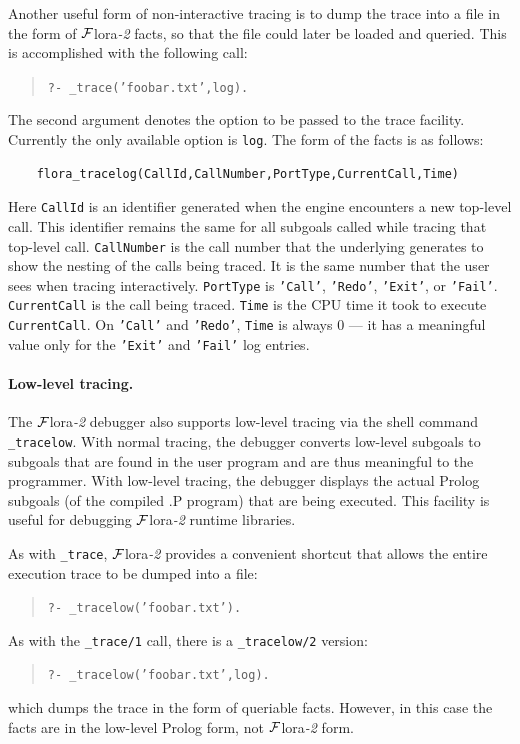 \documentclass[11pt]{article}
\newcommand{\FLORA}{{\mbox{\sc ${\cal F}${lora}\rm\emph{-2}}}\xspace}
\begin{document}
Another useful form of non-interactive
tracing is to dump the trace into a file in the form
of \FLORA facts, so that the file could later be loaded and queried. This
is accomplished with the following call:
\begin{quote}
  {\tt     ?- \_trace('foobar.txt',log).}
\end{quote}
The second argument denotes the option to be passed to the trace facility.
Currently the only available option is \texttt{log}.
The form of the facts is as follows:
\begin{verbatim}
    flora_tracelog(CallId,CallNumber,PortType,CurrentCall,Time)
\end{verbatim}
Here \texttt{CallId} is an identifier generated when the engine encounters a
new top-level call. This identifier remains the same for all subgoals
called while tracing that top-level call.
\texttt{CallNumber} is the call number that the underlying generates to show the
nesting of the calls being traced. It is the same number that the user sees when
tracing interactively.  \texttt{PortType} is \texttt{'Call'},
\texttt{'Redo'}, \texttt{'Exit'}, or \texttt{'Fail'}.   
\texttt{CurrentCall} is the call being traced.
\texttt{Time} is the CPU time it
took to execute \texttt{CurrentCall}. On \texttt{'Call'} and \texttt{'Redo'},
\texttt{Time} is always 0 --- it has a meaningful value only for the
\texttt{'Exit'} and \texttt{'Fail'} log entries.

\paragraph{Low-level tracing.}
The \FLORA debugger also supports low-level tracing via the shell command {\tt
  \_tracelow}. With normal tracing, the debugger converts low-level
subgoals to subgoals that are found in the user program and are thus
meaningful to the programmer. With low-level tracing, the debugger displays
the actual Prolog subgoals (of the compiled .P program) that are being
executed. This facility is useful for debugging \FLORA runtime libraries.

As with {\tt \_trace}, \FLORA provides a convenient shortcut that allows
the entire execution trace to be dumped into a file:
\begin{quote}
 \tt     ?- \_tracelow('foobar.txt').  
\end{quote}

As with the \texttt{\_trace/1} call, there is a \texttt{\_tracelow/2}   
version:
\begin{quote}
 \tt     ?- \_tracelow('foobar.txt',log).  
\end{quote}
which dumps the trace in the form of queriable facts. However, in this case
the facts are in the low-level Prolog form, not \FLORA form.
\end{document}
